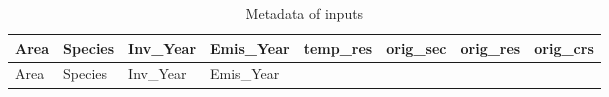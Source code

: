 \documentclass[
]{article}
\begin{document}
\begin{longtable}[]{@{}
  >{\centering\arraybackslash}p{}
  >{\centering\arraybackslash}p{}
  >{\centering\arraybackslash}p{}
  >{\centering\arraybackslash}p{}
  >{\centering\arraybackslash}p{}
  >{\centering\arraybackslash}p{}
  >{\centering\arraybackslash}p{}
  >{\centering\arraybackslash}p{}@{}}
\caption{Metadata of inputs}\tabularnewline
\toprule\noalign{}
\begin{minipage}[b]{\linewidth}\centering
Area
\end{minipage} & \begin{minipage}[b]{\linewidth}\centering
Species
\end{minipage} & \begin{minipage}[b]{\linewidth}\centering
Inv\_Year
\end{minipage} & \begin{minipage}[b]{\linewidth}\centering
Emis\_Year
\end{minipage} & \begin{minipage}[b]{\linewidth}\centering
temp\_res
\end{minipage} & \begin{minipage}[b]{\linewidth}\centering
orig\_sec
\end{minipage} & \begin{minipage}[b]{\linewidth}\centering
orig\_res
\end{minipage} & \begin{minipage}[b]{\linewidth}\centering
orig\_crs
\end{minipage} \\
\midrule\noalign{}
\endfirsthead
\toprule\noalign{}
\begin{minipage}[b]{\linewidth}\centering
Area
\end{minipage} & \begin{minipage}[b]{\linewidth}\centering
Species
\end{minipage} & \begin{minipage}[b]{\linewidth}\centering
Inv\_Year
\end{minipage} & \begin{minipage}[b]{\linewidth}\centering
Emis\_Year
\end{minipage} & \begin{minipage}[b]{\linewidth}\centering

\end{minipage}
\end{longtable}
\end{document}
